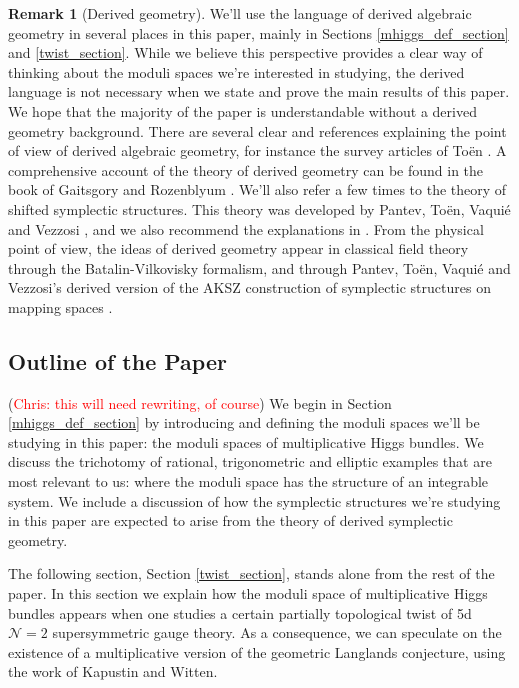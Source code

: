 \documentclass[11pt, oneside, reqno]{amsart}
\theoremstyle{definition} \newtheorem{definition}{Definition}[section]
\theoremstyle{definition} \newtheorem{remark}[definition]{Remark}
\theoremstyle{definition} \newtheorem{remarks}[definition]{Remarks}
\theoremstyle{definition} \newtheorem{question}[definition]{Question}
\theoremstyle{definition} \newtheorem*{note}{Note}
\theoremstyle{definition} \newtheorem{example}[definition]{Example}
\theoremstyle{definition} \newtheorem{examples}[definition]{Examples}
\newcommand{\mc}[1]{\mathcal{#1}}
\newcommand{\chris}[1]{(\textcolor{red}{Chris: #1})}
\begin{document}
\begin{remark}[Derived geometry]
  We'll use the language of derived algebraic geometry in several places in this paper, mainly in Sections \ref{mhiggs_def_section} and \ref{twist_section}.  While we believe this perspective provides a clear way of thinking about the moduli spaces we're interested in studying, the derived language is not necessary when we state and prove the main results of this paper.  We hope that the majority of the paper is understandable without a derived geometry background.  There are several clear and references explaining the point of view of derived algebraic geometry, for instance the survey articles of To\"en \cite{ToenOverview,ToenSurvey}.  A comprehensive account of the theory of derived geometry can be found in the book of Gaitsgory and Rozenblyum \cite{GRvol1, GRvol2}.  We'll also refer a few times to the theory of shifted symplectic structures.  This theory was developed by Pantev, To\"en, Vaqui\'e and Vezzosi \cite{PTVV}, and we also recommend the explanations in \cite{Calaque}.  From the physical point of view, the ideas of derived geometry appear in classical field theory through the Batalin-Vilkovisky formalism, and through Pantev, To\"en, Vaqui\'e and Vezzosi's derived version of the AKSZ construction of symplectic structures on mapping spaces \cite{AKSZ}. 
\end{remark}

\subsection{Outline of the Paper}
\chris{this will need rewriting, of course}
We begin in Section \ref{mhiggs_def_section} by introducing and defining the moduli spaces we'll be studying in this paper: the moduli spaces of multiplicative Higgs bundles.  We discuss the trichotomy of rational, trigonometric and elliptic examples that are most relevant to us: where the moduli space has the structure of an integrable system.  We include a discussion of how the symplectic structures we're studying in this paper are expected to arise from the theory of derived symplectic geometry.

The following section, Section \ref{twist_section}, stands alone from the rest of the paper.  In this section we explain how the moduli space of multiplicative Higgs bundles appears when one studies a certain partially topological twist of 5d $\mc N=2$ supersymmetric gauge theory.  As a consequence, we can speculate on the existence of a multiplicative version of the geometric Langlands conjecture, using the work of Kapustin and Witten.
\end{document}
